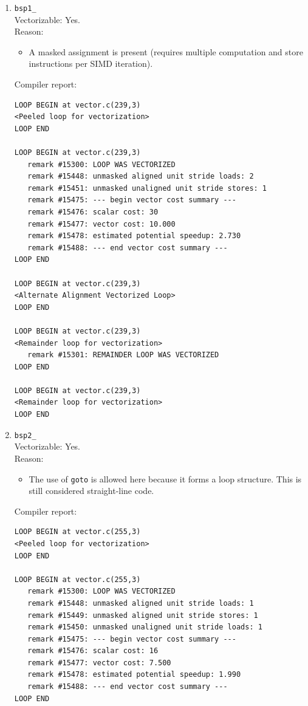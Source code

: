 \documentclass[11pt]{article}
\begin{document}
\lstset{style=optrpt}
\begin{enumerate}
\item \texttt{bsp1\_}\\
Vectorizable: Yes.\\
Reason:
\begin{itemize}
\item A masked assignment is present (requires multiple computation and store instructions per SIMD iteration).
\end{itemize}
Compiler report:
\begin{lstlisting}
LOOP BEGIN at vector.c(239,3)
<Peeled loop for vectorization>
LOOP END

LOOP BEGIN at vector.c(239,3)
   remark #15300: LOOP WAS VECTORIZED
   remark #15448: unmasked aligned unit stride loads: 2 
   remark #15451: unmasked unaligned unit stride stores: 1 
   remark #15475: --- begin vector cost summary ---
   remark #15476: scalar cost: 30 
   remark #15477: vector cost: 10.000 
   remark #15478: estimated potential speedup: 2.730 
   remark #15488: --- end vector cost summary ---
LOOP END

LOOP BEGIN at vector.c(239,3)
<Alternate Alignment Vectorized Loop>
LOOP END

LOOP BEGIN at vector.c(239,3)
<Remainder loop for vectorization>
   remark #15301: REMAINDER LOOP WAS VECTORIZED
LOOP END

LOOP BEGIN at vector.c(239,3)
<Remainder loop for vectorization>
LOOP END
\end{lstlisting}

\item \texttt{bsp2\_}\\
Vectorizable: Yes.\\
Reason:
\begin{itemize}
\item The use of \texttt{goto} is allowed here because it forms a loop structure. This is still considered straight-line code.
\end{itemize}
Compiler report:
\begin{lstlisting}
LOOP BEGIN at vector.c(255,3)
<Peeled loop for vectorization>
LOOP END

LOOP BEGIN at vector.c(255,3)
   remark #15300: LOOP WAS VECTORIZED
   remark #15448: unmasked aligned unit stride loads: 1 
   remark #15449: unmasked aligned unit stride stores: 1 
   remark #15450: unmasked unaligned unit stride loads: 1 
   remark #15475: --- begin vector cost summary ---
   remark #15476: scalar cost: 16 
   remark #15477: vector cost: 7.500 
   remark #15478: estimated potential speedup: 1.990 
   remark #15488: --- end vector cost summary ---
LOOP END


\end{lstlisting}
\end{enumerate}
\end{document}

